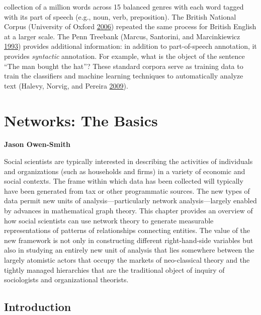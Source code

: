 \documentclass[]{krantz}
\begin{document}
\begin{itemize}
  collection of a million words across 15 balanced genres with each word
  tagged with its part of speech (e.g., noun, verb, preposition). The
  British National Corpus (University of Oxford
  \protect\hyperlink{ref-bnc}{2006}) repeated the same process for
  British English at a larger scale. The Penn Treebank (Marcus,
  Santorini, and Marcinkiewicz \protect\hyperlink{ref-marcus-93}{1993})
  provides additional information: in addition to part-of-speech
  annotation, it provides \emph{syntactic} annotation. For example, what
  is the object of the sentence ``The man bought the hat''? These
  standard corpora serve as training data to train the classifiers and
  machine learning techniques to automatically analyze text (Halevy,
  Norvig, and Pereira \protect\hyperlink{ref-halevy-09}{2009}).
\end{itemize}

\hypertarget{chap:networks}{\chapter{Networks: The
Basics}\label{chap:networks}}

\textbf{Jason Owen-Smith}

Social scientists are typically interested in describing the activities
of individuals and organizations (such as households and firms) in a
variety of economic and social contexts. The frame within which data has
been collected will typically have been generated from tax or other
programmatic sources. The new types of data permit new units of
analysis---particularly network analysis---largely enabled by advances
in mathematical graph theory. This chapter provides an overview of how
social scientists can use network theory to generate measurable
representations of patterns of relationships connecting entities. The
value of the new framework is not only in constructing different
right-hand-side variables but also in studying an entirely new unit of
analysis that lies somewhere between the largely atomistic actors that
occupy the markets of neo-classical theory and the tightly managed
hierarchies that are the traditional object of inquiry of sociologists
and organizational theorists.

\section{Introduction}\label{introduction-3}
\end{document}
